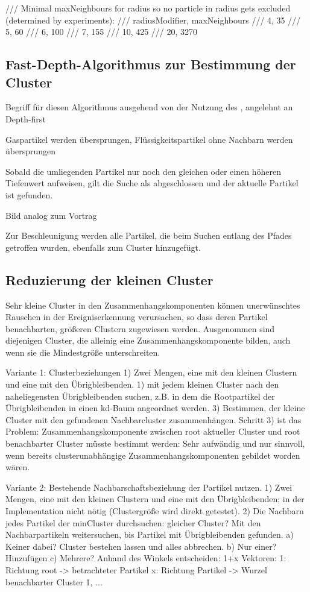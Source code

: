 	/// Minimal maxNeighbours for radius so no particle in radius gets excluded (determined by experiments):
	/// radiusModifier, maxNeighbours
	/// 4, 35
	/// 5, 60
	/// 6, 100
	/// 7, 155
	/// 10, 425
	/// 20, 3270


\subsection{Fast-Depth-Algorithmus zur Bestimmung der Cluster}\label{sec:fast-depth}
Begriff für diesen Algorithmus ausgehend von der Nutzung des , angelehnt an Depth-first

Gaspartikel werden übersprungen, Flüssigkeitspartikel ohne Nachbarn werden übersprungen

Sobald die umliegenden Partikel nur noch den gleichen oder einen höheren Tiefenwert aufweisen, gilt die Suche als abgeschlossen und der aktuelle Partikel ist gefunden.

Bild analog zum Vortrag


Zur Beschleunigung werden alle Partikel, die beim Suchen entlang des Pfades getroffen wurden, ebenfalls zum Cluster hinzugefügt.


\subsection{Reduzierung der kleinen Cluster}\label{sec:clusterreduktion}

Sehr kleine Cluster in den Zusammenhangskomponenten können unerwünschtes Rauschen in der Ereigniserkennung verursachen, so dass deren Partikel benachbarten, größeren Clustern zugewiesen werden. Ausgenommen sind diejenigen Cluster, die alleinig eine Zusammenhangskomponente bilden, auch wenn sie die Mindestgröße unterschreiten.

Variante 1: Clusterbeziehungen
1) Zwei Mengen, eine mit den kleinen Clustern und eine mit den Übrigbleibenden.
1) mit jedem kleinen Cluster nach den naheliegensten Übrigbleibenden suchen, z.B. in dem die Rootpartikel der Übrigbleibenden in einen kd-Baum angeordnet werden.
3) Bestimmen, der kleine Cluster mit den gefundenen Nachbarcluster zusammenhängen.
Schritt 3) ist das Problem: Zusammenhangskomponente zwischen root aktueller Cluster und root benachbarter Cluster müsste bestimmt werden: Sehr aufwändig und nur sinnvoll, wenn bereits clusterunabhängige Zusammenhangskomponenten gebildet worden wären.

Variante 2: Bestehende Nachbarschaftsbeziehung der Partikel nutzen.
1) Zwei Mengen, eine mit den kleinen Clustern und eine mit den Übrigbleibenden; in der Implementation nicht nötig (Clustergröße wird direkt getestet).
2) Die Nachbarn jedes Partikel der minCluster durchsuchen: gleicher Cluster? Mit den Nachbarpartikeln weitersuchen, bis Partikel mit Übrigbleibenden gefunden.
a) Keiner dabei? Cluster bestehen lassen und alles abbrechen.
b) Nur einer? Hinzufügen
c) Mehrere? Anhand des Winkels entscheiden:
1+x Vektoren:
1: Richtung root -> betrachteter Partikel
x: Richtung Partikel -> Wurzel benachbarter Cluster 1, ...

